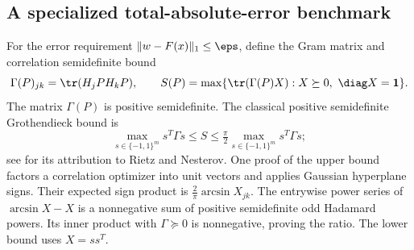\subsection{A specialized total-absolute-error benchmark}

For the error requirement $\|w-F(x)\|_1\le\eps$, define the Gram matrix
and correlation semidefinite bound
\begin{equation}\label{eq:l1-covariance}
 \Gamma(P)_{jk}=\tr(H_jPH_kP),\qquad
 S(P)=\max\{\tr(\Gamma(P)X):X\succeq0,\ \diag X=\mathbf1\}.
\end{equation}
The matrix $\Gamma(P)$ is positive semidefinite. The classical positive
semidefinite Grothendieck bound is
\begin{equation}\label{eq:psd-grothendieck}
 \max_{s\in\{-1,1\}^m}s^T\Gamma s
 \le S\le\tfrac\pi2\max_{s\in\{-1,1\}^m}s^T\Gamma s;
\end{equation}
see \citet{briet2010} for its attribution to Rietz and Nesterov.
One proof of the upper bound factors a correlation optimizer into unit
vectors and applies Gaussian hyperplane signs. Their expected sign product
is $\frac2\pi\arcsin X_{jk}$. The entrywise power series of
$\arcsin X-X$ is a nonnegative sum of positive semidefinite odd Hadamard
powers. Its inner product with $\Gamma\succeq0$ is nonnegative, proving
the ratio. The lower bound uses $X=ss^T$.

